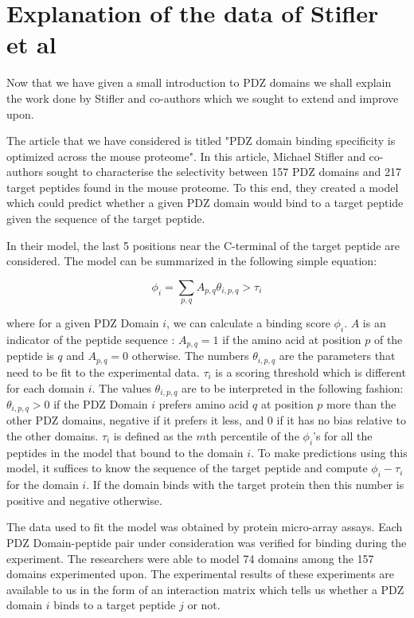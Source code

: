 \documentclass[a4paper, 12pt]{article}
\begin{document}
	\section{Explanation of the data of Stifler et al}

	Now that we have given a small introduction to PDZ domains we shall explain the work done by Stifler and co-authors which we sought to extend and improve upon.

	The article that we have considered is titled "PDZ domain binding specificity is optimized across the mouse proteome". In this article, Michael Stifler and co-authors sought to characterise the selectivity between 157 PDZ domains and 217 target peptides found in the mouse proteome. To this end, they created a model which could predict whether a given PDZ domain would bind to a target peptide given the sequence of the target peptide.

	In their model, the last 5 positions near the C-terminal of the target peptide are considered. The model can be summarized in the following simple equation: 

	\begin{equation}
	\phi_{i} = \sum_{p,q} A_{p,q} \theta_{i,p,q} > \tau_{i}
	\end{equation}

	where for a given PDZ Domain $i$, we can calculate a binding score $\phi_{i}$. $A$ is an indicator of the peptide sequence : $A_{p,q} =1$ if the amino acid at position $p$ of the peptide is $q$ and $A_{p,q} =0$ otherwise. The numbers $\theta_{i,p,q}$ are the parameters that need to be fit to the experimental data. $\tau_{i}$ is a scoring threshold which is different for each domain $i$. The values $\theta_{i,p,q}$ are to be interpreted in the following fashion: $\theta_{i,p,q} > 0$ if the PDZ Domain $i$ prefers amino acid $q$ at position $p$ more than the other PDZ domains, negative if it prefers it less, and 0 if it has no bias relative to the other domains. $\tau_{i}$ is defined as the $m$th percentile of the $\phi_{i}$'s for all the peptides in the model that bound to the domain $i$. To make predictions using this model, it suffices to know the sequence of the target peptide and compute $\phi_{i} - \tau_{i}$ for the domain $i$. If the domain binds with the target protein then this number is positive and negative otherwise. 

	The data used to fit the model was obtained by protein micro-array assays. Each PDZ Domain-peptide pair under consideration was verified for binding during the experiment. The researchers were able to model 74 domains among the 157 domains experimented upon. The experimental results of these experiments are available to us in the form of an interaction matrix which tells us whether a PDZ domain $i$ binds to a target peptide $j$ or not. 
\end{document}
